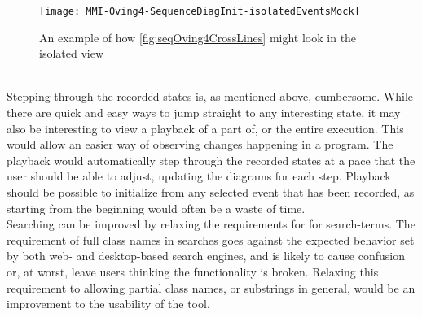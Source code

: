 \begin{figure}[H]
	\centering
	\texttt{[image: MMI-Oving4-SequenceDiagInit-isolatedEventsMock]}
	\caption{An example of how \autoref{fig:seqOving4CrossLines} might look in the isolated view}
	\label{fig:seqOving4IsolatedMock}
\end{figure}
~\\

Stepping through the recorded states is, as mentioned above, cumbersome.
While there are quick and easy ways to jump straight to any interesting state, it may also be interesting to view a playback of a part of, or the entire execution.
This would allow an easier way of observing changes happening in a program.
The playback would automatically step through the recorded states at a pace that the user should be able to adjust, updating the diagrams for each step.
Playback should be possible to initialize from any selected event that has been recorded, as starting from the beginning would often be a waste of time.
~\\

Searching can be improved by relaxing the requirements for for search-terms.
The requirement of full class names in searches goes against the expected behavior set by both web- and desktop-based search engines, and is likely to cause confusion or, at worst, leave users thinking the functionality is broken.
Relaxing this requirement to allowing partial class names, or substrings in general, would be an improvement to the usability of the tool.
~\\